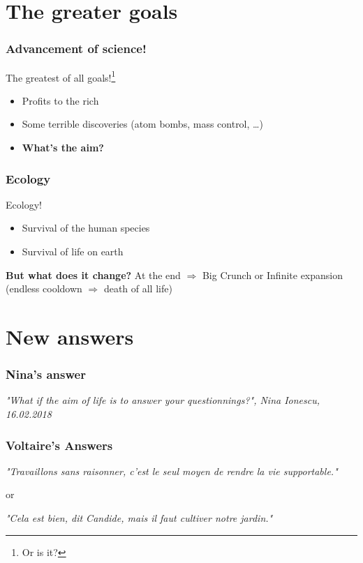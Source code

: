 \documentclass{beamer}
\begin{document}
	\section{The greater goals}    
    
    \begin{frame}
    		\frametitle{Advancement of science!}
    		
    		The greatest of all goals!\footnote{Or is it?}
    		\begin{itemize}
    			\item Profits to the rich
    			\item Some terrible discoveries (atom bombs, mass control, \dots)
    			\item \textbf{What's the aim?}
    		\end{itemize}
    \end{frame}
    
    \begin{frame}
    		\frametitle{Ecology}
    		
    		Ecology!
    		\begin{itemize}
    			\item Survival of the human species 
    			\item Survival of life on earth
    		\end{itemize}
    		
    		\textbf{But what does it change?} At the end $\Rightarrow$ Big Crunch or Infinite expansion (endless cooldown $\Rightarrow$ death of all life)
    		
    		
    \end{frame}
    
    \section{New answers} %
    \begin{frame}
    		\frametitle{Nina's answer}
    		
    		\textit{"What if the aim of life is to answer your questionnings?", Nina Ionescu, 16.02.2018}
    \end{frame}
    \begin{frame}
    		\frametitle{Voltaire's Answers}
    		
    		\textit{"Travaillons sans raisonner, c'est le seul moyen de rendre la vie supportable."}
    		\begin{center}
    		or
    		\end{center}
    		\textit{"Cela est bien, dit Candide, mais il faut cultiver notre jardin."}
    		
    \end{frame}
    
\end{document}
